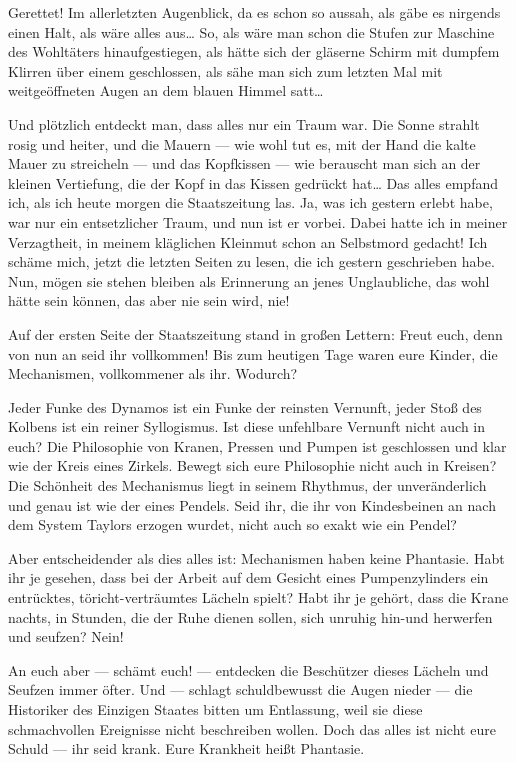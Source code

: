 Gerettet! Im allerletzten Augenblick, da es schon so aussah, als
gäbe es nirgends einen Halt, als wäre alles aus\ldots{} So, als wäre man
schon die Stufen zur Maschine des Wohltäters hinaufgestiegen, als
hätte sich der gläserne Schirm mit dumpfem Klirren über einem
geschlossen, als sähe man sich zum letzten Mal mit weitgeöffneten
Augen an dem blauen Himmel satt\ldots{}

Und plötzlich entdeckt man, dass alles nur ein Traum war. Die Sonne
strahlt rosig und heiter, und die Mauern — wie wohl tut es, mit der
Hand die kalte Mauer zu streicheln — und das Kopfkissen — wie
berauscht man sich an der kleinen Vertiefung, die der Kopf in das
Kissen gedrückt hat\ldots{} Das alles empfand ich, als ich heute morgen
die Staatszeitung las. Ja, was ich gestern erlebt habe, war nur ein
entsetzlicher Traum, und nun ist er vorbei. Dabei hatte ich in
meiner Verzagtheit, in meinem kläglichen Kleinmut schon an
Selbstmord gedacht! Ich schäme mich, jetzt die letzten Seiten zu
lesen, die ich gestern geschrieben habe. Nun, mögen sie stehen
bleiben als Erinnerung an jenes Unglaubliche, das wohl hätte sein
können, das aber nie sein wird, nie!

Auf der ersten Seite der Staatszeitung stand in großen Lettern:
Freut euch, denn von nun an seid ihr vollkommen! Bis zum heutigen
Tage waren eure Kinder, die Mechanismen, vollkommener als ihr.
Wodurch?

Jeder Funke des Dynamos ist ein Funke der reinsten Vernunft, jeder
Stoß des Kolbens ist ein reiner Syllogismus. Ist diese unfehlbare
Vernunft nicht auch in euch? Die Philosophie von Kranen, Pressen
und Pumpen ist geschlossen und klar wie der Kreis eines Zirkels.
Bewegt sich eure Philosophie nicht auch in Kreisen? Die Schönheit
des Mechanismus liegt in seinem Rhythmus, der unveränderlich und
genau ist wie der eines Pendels. Seid ihr, die ihr von Kindesbeinen
an nach dem System Taylors erzogen wurdet, nicht auch so exakt wie
ein Pendel?

Aber entscheidender als dies alles ist: Mechanismen haben keine
Phantasie. Habt ihr je gesehen, dass bei der Arbeit auf dem Gesicht
eines Pumpenzylinders ein entrücktes, töricht-verträumtes Lächeln
spielt? Habt ihr je gehört, dass die Krane nachts, in Stunden, die
der Ruhe dienen sollen, sich unruhig hin-und herwerfen und seufzen?
Nein!

An euch aber — schämt euch! — entdecken die Beschützer dieses
Lächeln und Seufzen immer öfter. Und — schlagt schuldbewusst die
Augen nieder — die Historiker des Einzigen Staates bitten um
Entlassung, weil sie diese schmachvollen Ereignisse nicht
beschreiben wollen. Doch das alles ist nicht eure Schuld — ihr seid
krank. Eure Krankheit heißt Phantasie.

